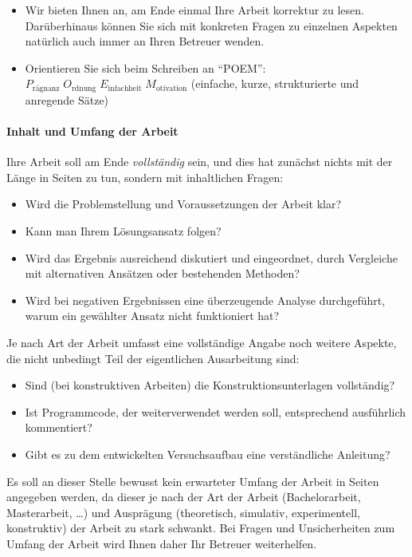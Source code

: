 \begin{itemize}
\begin{itemize}
      \item \label{itm:Ordner} \textbf{Zusätzliches Material} wie \zB\ der vollständige Programmcode eines Software-Projekts gehört nicht in die Arbeit, sondern kann in einem separaten Ordner abgelegt werden.
    \end{itemize}
  \item Wir bieten Ihnen an, am Ende einmal Ihre Arbeit korrektur zu lesen.
    Darüberhinaus können Sie sich mit konkreten Fragen zu einzelnen Aspekten natürlich auch immer an Ihren Betreuer wenden.
  \item Orientieren Sie sich beim Schreiben an "`POEM"':\\
    $P_\text{rägnanz}\; O_\text{rdnung}\; E_\text{infachheit}\; M_\text{otivation}$ (einfache, kurze, strukturierte und anregende Sätze)
\end{itemize}


\paragraph{Inhalt und Umfang der Arbeit}
Ihre Arbeit soll am Ende \emph{vollständig} sein, und dies hat zunächst nichts mit der Länge in Seiten zu tun, sondern mit inhaltlichen Fragen:
\begin{itemize}
  \item Wird die Problemstellung und Voraussetzungen der Arbeit klar?
  \item Kann man Ihrem Lösungsansatz folgen?
  \item Wird das Ergebnis ausreichend diskutiert und eingeordnet, \zB durch Vergleiche mit alternativen Ansätzen oder bestehenden Methoden?
  \item Wird bei negativen Ergebnissen eine überzeugende Analyse durchgeführt, warum ein gewählter Ansatz nicht funktioniert hat?
\end{itemize}
Je nach Art der Arbeit umfasst eine vollständige Angabe noch weitere Aspekte, die nicht unbedingt Teil der eigentlichen Ausarbeitung sind:
\begin{itemize}
  \item Sind (bei konstruktiven Arbeiten) die Konstruktionsunterlagen vollständig?
  \item Ist Programmcode, der weiterverwendet werden soll, entsprechend ausführlich kommentiert?
  \item Gibt es zu dem entwickelten Versuchsaufbau eine verständliche Anleitung?
\end{itemize}

Es soll an dieser Stelle bewusst kein erwarteter Umfang der Arbeit in Seiten angegeben werden, da dieser je nach der Art der Arbeit (Bachelorarbeit, Masterarbeit, \ldots) und Ausprägung (theoretisch, simulativ, experimentell, konstruktiv) der Arbeit zu stark schwankt.
Bei Fragen und Unsicherheiten zum Umfang der Arbeit wird Ihnen daher Ihr Betreuer weiterhelfen.





